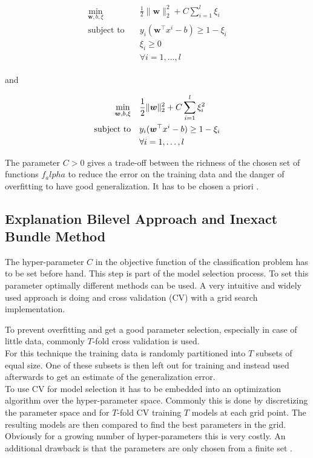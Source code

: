 \begin{align}
\begin{split}
	\min_{\bm{w},b,\xi} \quad & \frac{1}{2} \|\bm{w}\|^2_2+C\sum_{i=1}^l{\xi_i} \\
	\text{subject to} \quad & y_i(\bm{w}^{\top}x^i-b) \geq 1 - \xi_i \\
	& \xi_i \geq 0 \\
	& 	\forall i = 1, \dots , l
\end{split}
\label{SVM_1}
\end{align}

and

\begin{align}
\begin{split}
	\min_{\bm{w},b,\xi} \quad & \frac{1}{2} \|\bm{w}\|^2_2+C\sum_{i=1}^l{\xi_i^2} \vspace{0.5ex}\\
	\text{subject to} \quad & y_i(\bm{w}^{\top}x^i-b) \geq 1 - \xi_i \vspace{0.5ex}\\
	& 	\forall i = 1, \dots , l
\end{split}
\label{SVM_2}
\end{align}


The parameter \(C > 0\) gives a trade-off between the richness of the chosen set of functions \(f_alpha\) to reduce the error on the training data and the danger of overfitting to have good generalization. It has to be chosen a priori \cite{Kunapuli2008}.


\subsection{Explanation Bilevel Approach and Inexact Bundle Method}

The hyper-parameter \(C\) in the objective function of the classification problem has to be set before hand. This step is part of the model selection process.
To set this parameter optimally different methods can be used.
A very intuitive and widely used approach is doing  and cross validation (CV) with a grid search implementation.

To prevent overfitting and get a good parameter selection, especially in case of little data, commonly \(T\)-fold cross validation is used. \\
For this technique the training data is randomly partitioned into \(T\) subsets of equal size. One of these subsets is then left out for training and instead used afterwards to get an estimate of the generalization error.  \\
To use CV for model selection it has to be embedded into an optimization algorithm over the hyper-parameter space. 
Commonly this is done by discretizing the parameter space and for \(T\)-fold CV training \(T\) models at each grid point. The resulting models are then compared to find the best parameters in the grid.
Obviously for a growing number of hyper-parameters this is very costly. An additional drawback is that the parameters are only chosen from a finite set \cite{Kunapuli2008}.

